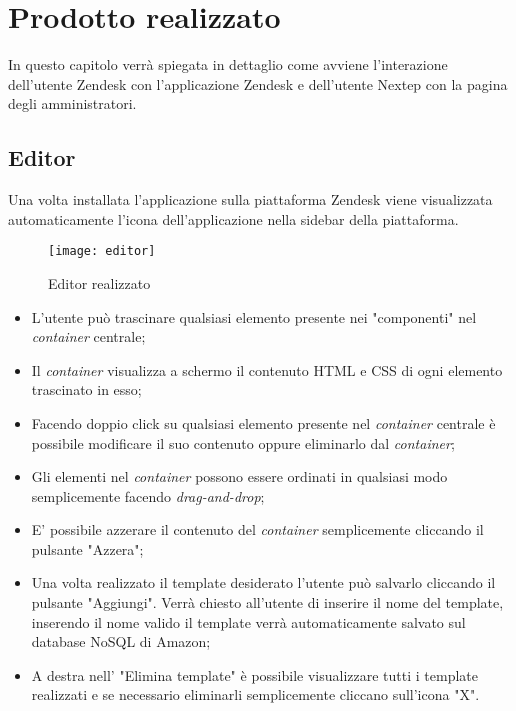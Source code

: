 
\chapter{Prodotto realizzato}
\label{cap:progetto-terminato}
In questo capitolo verrà spiegata in dettaglio come avviene l’interazione dell'utente Zendesk con l'applicazione
Zendesk e dell'utente Nextep con la pagina degli amministratori.

\section{Editor}
Una volta installata l'applicazione sulla piattaforma Zendesk viene visualizzata automaticamente l'icona dell'applicazione nella sidebar della piattaforma. 
\begin{figure}[!h] 
	\centering 
	\texttt{[image: editor]} 
	\caption{Editor realizzato }
\end{figure}
\begin{itemize}
	\item L'utente può trascinare qualsiasi elemento presente nei "componenti" nel \emph{container} centrale;
	\item Il \emph{container} visualizza a schermo il contenuto  HTML e CSS di ogni elemento trascinato in esso;
	\item Facendo doppio click su qualsiasi elemento presente nel \emph{container} centrale è possibile modificare il suo contenuto oppure eliminarlo dal \emph{container};
	\item Gli elementi nel \emph{container} possono essere ordinati in qualsiasi modo semplicemente facendo \emph{drag-and-drop};
	\item E' possibile azzerare il contenuto del \emph{container} semplicemente cliccando il pulsante "Azzera";
	\item Una volta realizzato il template desiderato l'utente può salvarlo cliccando il pulsante "Aggiungi". Verrà chiesto all'utente di inserire il nome del template, inserendo il nome valido il template verrà automaticamente salvato sul database NoSQL di Amazon;
	\item A destra nell' "Elimina template" è possibile visualizzare tutti i template realizzati e se necessario eliminarli semplicemente cliccano sull'icona "X".  
\end{itemize}
